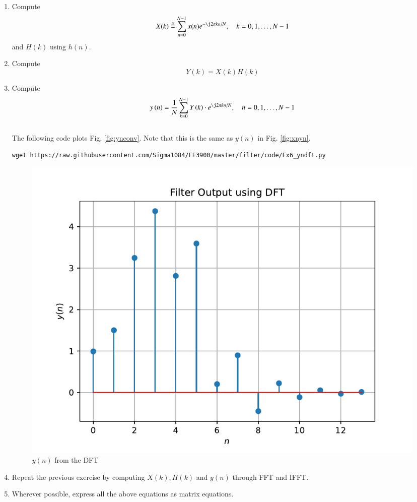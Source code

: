 \documentclass[journal,12pt,twocolumn]{IEEEtran}
\renewcommand\thesection{\arabic{section}}
\begin{document}
\begin{enumerate}[label=\thesection.\arabic*]

\item
Compute
\begin{equation}
X(k) \define \sum _{n=0}^{N-1}x(n) e^{-\j2\pi kn/N}, \quad k = 0,1,\dots, N-1
\end{equation}
and $H(k)$ using $h(n)$.
\item Compute 
\begin{equation}
Y(k) = X(k)H(k)
\end{equation}

\item Compute
\begin{equation}
 y\brak{n}={\frac {1}{N}}\sum _{k=0}^{N-1}Y\brak{k}\cdot e^{\j 2\pi kn/N},\quad n = 0,1,\dots, N-1
\end{equation}
\\
\solution The following code plots Fig. \ref{fig:ynconv}. Note that this is the same as 
$y(n)$ in  Fig. 
\ref{fig:xnyn}. 
%
\begin{lstlisting}
wget https://raw.githubusercontent.com/Sigma1084/EE3900/master/filter/code/Ex6_yndft.py
\end{lstlisting}
\begin{figure}[!ht]
\centering
\includegraphics[width=\columnwidth]{./figs/yndft}
\caption{$y(n)$ from the DFT}
\label{fig:yndft}
\end{figure}

\item Repeat the previous exercise by computing $X(k), H(k)$ and $y(n)$ through FFT and 
IFFT.
\item Wherever possible, express all the above equations as matrix equations.
\end{enumerate}
%
\end{document}
